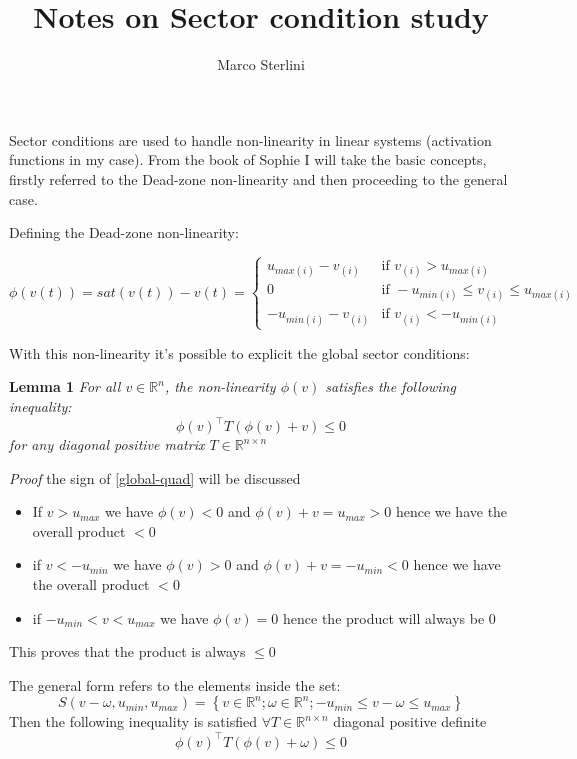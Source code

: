 \documentclass[12pt]{article}
\begin{document}
\date{}
\author{Marco Sterlini}

\title{Notes on Sector condition study}
\maketitle

Sector conditions are used to handle non-linearity in linear systems (activation functions in my case). From the book of Sophie I will take the basic concepts, firstly referred to the Dead-zone non-linearity and then proceeding to the general case. 

Defining the Dead-zone non-linearity:

\begin{equation} \label{non-l}
  \phi(v(t)) = sat(v(t)) - v(t) = \begin{cases}
    u_{max(i)} - v_{(i)} & \text{if } v_{(i)} > u_{max(i)}\\
    0 & \text{if } -u_{min(i)} \leq v_{(i)} \leq u_{max(i)}\\
    -u_{min(i)} - v_{(i)} & \text{if }  v_{(i)} < -u_{min(i)}
  \end{cases}
\end{equation}

With this non-linearity it's possible to explicit the global sector conditions:

\textbf{Lemma 1} \textit{For all $v \in \mathbb{R}^n$, the non-linearity $\phi(v)$ satisfies the following inequality:}
\begin{equation} \label{global-quad}
  \phi(v)^{\top} T \left( \phi(v) + v \right) \leq 0
\end{equation}
\textit{for any diagonal positive matrix $T \in \mathbb{R}^{n \times n}$}

\textit{Proof} the sign of \ref{global-quad} will be discussed
\begin{itemize}
  \item If $v > u_{max}$ we have $\phi(v) < 0$ and $\phi(v) + v = u_{max} > 0$ hence we have the overall product $< 0$
  \item if $v < - u_{min}$ we have $\phi(v) > 0$ and $\phi(v) + v = -u_{min} < 0$ hence we have the overall product $< 0$
  \item if $-u_{min} < v < u_{max}$ we have $\phi(v) = 0$ hence the product will always be $0$
\end{itemize}
This proves that the product is always $\leq 0$

The general form refers to the elements inside the set:
\begin{equation} \label{s-cond}
  S(v - \omega, u_{min}, u_{max}) = \left\{ v \in \mathbb{R}^n ; \omega \in \mathbb{R}^n; - u_{min} \leq v - \omega \leq u_{max} \right\}
\end{equation}
Then the following inequality is satisfied $\forall T \in \mathbb{R}^{n \times n}$ diagonal positive definite
\begin{equation} \label{sec-cond-0-1j}
  \phi(v)^{\top} T \left( \phi(v) + \omega \right) \leq 0
\end{equation}
\end{document}
